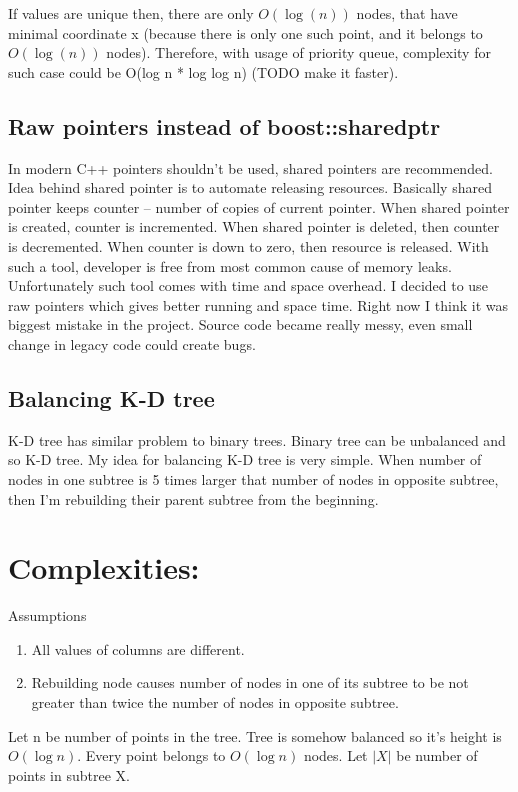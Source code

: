 \documentclass{llncs}
\newcommand{\<}{\langle}
\renewcommand{\>}{\rangle}
\begin{document}
If values are unique then, there are only $O(\log (n))$ nodes, that have minimal coordinate x (because there is only one such point, and it belongs to $O(\log (n))$ nodes). Therefore, with
usage of priority queue, complexity for such case could be O(log n * log log n) (TODO make it faster).

\subsection{Raw pointers instead of boost::shared\textunderscore ptr}

In modern C++ pointers shouldn't be used, shared pointers are recommended. Idea behind shared pointer is to automate releasing resources. Basically shared pointer keeps counter – number of copies of current pointer. When shared pointer is created, counter is incremented. When shared pointer is deleted, then counter is decremented. When counter is down to zero, then resource is released. With such a tool, developer is free from most common cause of memory leaks. Unfortunately such tool comes with time and space overhead. I decided to use raw pointers which gives better running and space time.
Right now I think it was biggest mistake in the project. Source code became really messy, even small change in legacy code could create bugs.

\subsection{Balancing K-D tree}
K-D tree has similar problem to binary trees. Binary tree can be unbalanced and so K-D tree. My idea for balancing K-D tree is very simple. When number of nodes in one subtree is 5 times larger that number of nodes in opposite subtree, then I'm rebuilding their parent subtree from the beginning.

\section{Complexities:}

Assumptions
\begin{enumerate}
\item All values of columns are different.
\item Rebuilding node causes number of nodes in one of its subtree to be not greater than twice the number of nodes in opposite subtree.
\end{enumerate}

Let n be number of points in the tree. Tree is somehow balanced so it's height is $O(\log n)$. Every point belongs to $O(\log n)$ nodes. Let $|X|$ be number of points in subtree X.
\end{document}
